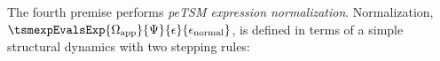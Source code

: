 \documentclass[acmlarge,review,anonymous]{acmart}\settopmatter{printfolios=true}
\begin{document}
The fourth premise performs \emph{peTSM expression normalization}. Normalization, $\tsmexpEvalsExp{\Omega_\text{app}}{\Psi}{\epsilon}{\epsilon_\text{normal}}$, is defined in terms of a simple structural dynamics with two stepping rules:
\begin{mathpar}

\end{mathpar}
\end{document}
